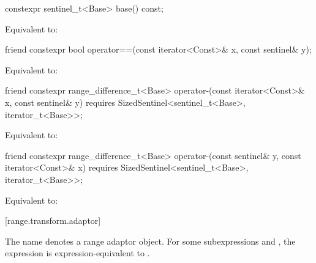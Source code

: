 \begin{itemdecl}
constexpr sentinel_t<Base> base() const;
\end{itemdecl}

\begin{itemdescr}
\pnum
\effects Equivalent to: 
\end{itemdescr}

\begin{itemdecl}
friend constexpr bool operator==(const iterator<Const>& x, const sentinel& y);
\end{itemdecl}

\begin{itemdescr}
\pnum
\effects Equivalent to: 
\end{itemdescr}

%
\begin{itemdecl}
friend constexpr range_difference_t<Base>
  operator-(const iterator<Const>& x, const sentinel& y)
    requires SizedSentinel<sentinel_t<Base>, iterator_t<Base>>;
\end{itemdecl}

\begin{itemdescr}
\pnum
\effects Equivalent to: 
\end{itemdescr}

%
\begin{itemdecl}
friend constexpr range_difference_t<Base>
  operator-(const sentinel& y, const iterator<Const>& x)
    requires SizedSentinel<sentinel_t<Base>, iterator_t<Base>>;
\end{itemdecl}

\begin{itemdescr}
\pnum
\effects Equivalent to: 
\end{itemdescr}

[range.transform.adaptor]{}

\pnum
The name  denotes a
range adaptor object.
For some subexpressions  and , the expression
 is expression-equivalent to
.


